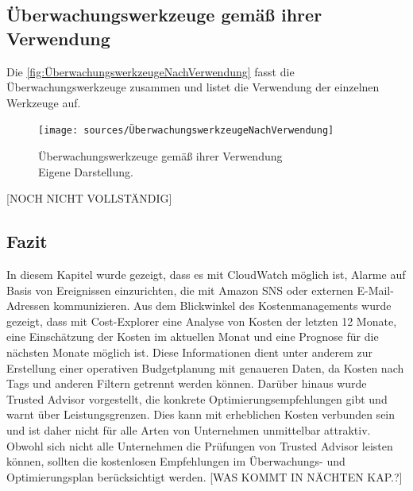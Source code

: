\subsection{Überwachungswerkzeuge gemäß ihrer Verwendung}
Die \autoref{fig:ÜberwachungswerkzeugeNachVerwendung} fasst die Überwachungswerkzeuge zusammen und listet die Verwendung der einzelnen Werkzeuge auf.
\begin{figure}[h!]
  \centering
  \texttt{[image: sources/ÜberwachungswerkzeugeNachVerwendung]}
  \caption[Überwachungswerkzeuge gemäß ihrer Verwendung]{}
  \label{fig:ÜberwachungswerkzeugeNachVerwendung} 
  Überwachungswerkzeuge gemäß ihrer Verwendung\\
  Eigene Darstellung\cite{AMZ12, AMZ20, AMZ21}. 
\end{figure}
[NOCH NICHT VOLLSTÄNDIG]


\subsection*{Fazit}
In diesem Kapitel wurde gezeigt, dass es mit CloudWatch möglich ist, Alarme auf Basis von Ereignissen einzurichten, die mit Amazon SNS oder externen E-Mail-Adressen kommunizieren. %
Aus dem Blickwinkel des Kostenmanagements wurde gezeigt, dass mit Cost-Explorer eine Analyse von Kosten der letzten 12 Monate, eine Einschätzung der Kosten im aktuellen Monat und eine Prognose für die nächsten Monate möglich ist. Diese Informationen dient unter anderem zur Erstellung einer operativen Budgetplanung mit genaueren Daten, da
Kosten nach Tags und anderen Filtern getrennt werden können.
Darüber hinaus wurde Trusted Advisor vorgestellt, die konkrete Optimierungsempfehlungen gibt und warnt über Leistungsgrenzen. Dies kann mit erheblichen Kosten verbunden sein und ist daher nicht für alle Arten von Unternehmen unmittelbar attraktiv. Obwohl sich nicht alle Unternehmen die Prüfungen von Trusted Advisor leisten können, sollten die kostenlosen Empfehlungen im Überwachungs- und Optimierungsplan berücksichtigt werden.
[WAS KOMMT IN NÄCHTEN KAP.?]

